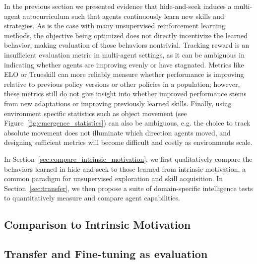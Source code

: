 In the previous section we presented evidence that hide-and-seek induces a multi-agent autocurriculum such that agents continuously learn new skills and strategies.
As is the case with many unsupervised reinforcement learning methods, the objective being optimized does not directly incentivize the learned behavior, making evaluation of those behaviors nontrivial.
Tracking reward is an insufficient evaluation metric in multi-agent settings, as it can be ambiguous in indicating whether agents are improving evenly or have stagnated.
Metrics like ELO \citep{elo1978rating} or Trueskill  \citep{herbrich2007trueskill} can more reliably measure whether performance is improving relative to previous policy versions or other policies in a population; however, these metrics still do not give insight into whether improved performance stems from new adaptations or improving previously learned skills.
Finally, using environment specific statistics such as object movement (see Figure~\ref{fig:emergence_statistics}) can also be ambiguous, e.g. the choice to track absolute movement does not illuminate which direction agents moved, and designing sufficient metrics will become difficult and costly as environments scale.

In Section~\ref{sec:compare_intrinsic_motivation}, we first qualitatively compare the behaviors learned in hide-and-seek to those learned from intrinsic motivation, a common paradigm for unsupervised exploration and skill acquisition. In Section~\ref{sec:transfer}, we then propose a suite of domain-specific intelligence tests to quantitatively measure and compare agent capabilities.

\subsection{Comparison to Intrinsic Motivation}


\subsection{Transfer and Fine-tuning as evaluation}


